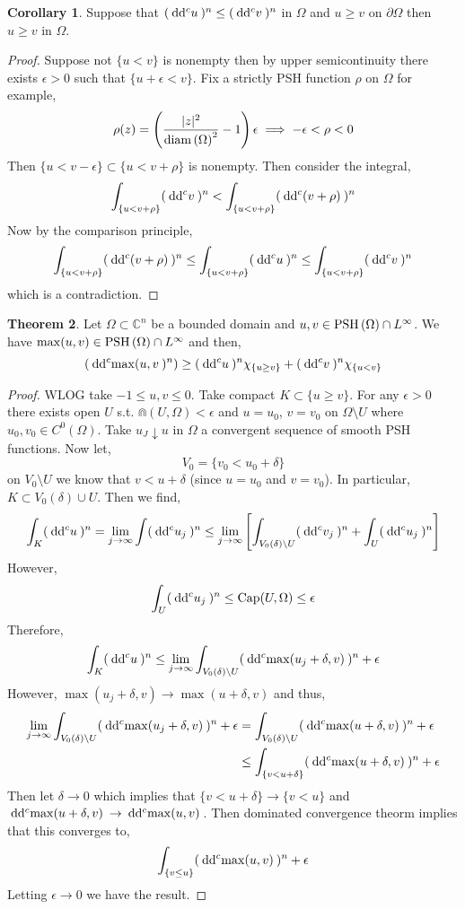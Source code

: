 \documentclass[12pt]{extarticle}
\newcommand{\C}{\mathbb{C}}
\theoremstyle{definition}
\newtheorem{theorem}{Theorem}[section]
\newtheorem{corollary}[theorem]{Corollary}
\begin{document}
\begin{corollary}
Suppose that $(\: \mathrm{d}\mathrm{d}^c{u} \:)^n \le (\: \mathrm{d}\mathrm{d}^c{v} \:)^n$ in $\Omega$ and $u \ge v$ on $\partial \Omega$ then $u \ge v$ in $\Omega$.
\end{corollary}

\begin{proof}
Suppose not $\{ u < v \}$ is nonempty then by upper semicontinuity there exists $\epsilon > 0$ such that $\{ u + \epsilon < v \}$. Fix a strictly PSH function $\rho$ on $\Omega$ for example,
\[ \rho(z) = \left( \frac{|z|^2}{\mathrm{diam}\left(\Omega\right)^2} - 1 \right) \epsilon \implies - \epsilon < \rho < 0 \]
Then $\{ u < v - \epsilon \} \subset \{ u < v + \rho \}$ is nonempty. Then consider the integral,
\[ \int_{\{u < v + \rho \}} (\: \mathrm{d}\mathrm{d}^c{v} \:)^n < \int_{\{u < v + \rho \}} (\: \mathrm{d}\mathrm{d}^c{(v + \rho)} \:)^n \] 
Now by the comparison principle, 
\[ \int_{\{u < v + \rho \}} (\: \mathrm{d}\mathrm{d}^c{(v + \rho)} \:)^n \le \int_{\{u < v + \rho\}} (\: \mathrm{d}\mathrm{d}^c{u} \:)^n \le \int_{\{u < v + \rho \}} (\: \mathrm{d}\mathrm{d}^c{v} \:)^n \] 
which is a contradiction. 
\end{proof}

\begin{theorem}
Let $\Omega \subset \C^n$ be a bounded domain and $u,v \in \mathrm{PSH}\left( \Omega \right) \cap L^\infty$. We have $\max(u,v) \in \mathrm{PSH}\left( \Omega \right) \cap L^\infty$ and then,
\[ (\: \mathrm{d}\mathrm{d}^c{\max(u,v} \:)^n) \ge (\: \mathrm{d}\mathrm{d}^c{u} \:)^n \chi_{\{ u \ge v\}} + (\: \mathrm{d}\mathrm{d}^c{v} \:)^n \chi_{\{u < v \}} \]
\end{theorem}

\begin{proof}
WLOG take $-1 \le u,v \le 0$. Take compact $K \subset \{ u \ge v \}$. For any $\epsilon > 0$ there exists open $U$ s.t. $\Cap(U, \Omega) < \epsilon$ and $u = u_0$, $v = v_0$ on $\Omega \setminus U$ where $u_0, v_0 \in C^0(\Omega)$. Take $u_J \downarrow u$ in $\Omega$ a convergent sequence of smooth PSH functions. Now let,
\[ V_0 = \{ v_0 < u_0 + \delta \} \] 
on $V_0 \setminus U$ we know that $v < u + \delta$ (since $u = u_0$ and $v = v_0$). In particular, $K \subset V_0(\delta) \cup U$. Then we find,
\[ \int_K (\: \mathrm{d}\mathrm{d}^c{u} \:)^n = \lim_{j \to \infty} \int (\: \mathrm{d}\mathrm{d}^c{u_j} \:)^n \le \lim_{j \to \infty} \left[ \int_{V_0(\delta) \setminus U} (\: \mathrm{d}\mathrm{d}^c{v_j} \:)^n + \int_U (\: \mathrm{d}\mathrm{d}^c{u_j} \:)^n \right]  \] 
However, 
\[ \int_U (\: \mathrm{d}\mathrm{d}^c{u_j} \:)^n \le \mathrm{Cap}(U, \Omega) \le \epsilon \]
Therefore, 
\[ \int_K (\: \mathrm{d}\mathrm{d}^c{u} \:)^n \le \lim_{j \to \infty} \int_{V_0(\delta) \setminus U} (\: \mathrm{d}\mathrm{d}^c{\max(u_j + \delta, v)} \:)^n + \epsilon \]
However, $\max(u_j + \delta, v) \to \max(u + \delta, v)$ and thus,
\begin{align*}
\lim_{j \to \infty} \int_{V_0(\delta) \setminus U} (\: \mathrm{d}\mathrm{d}^c{\max(u_j + \delta, v)} \:)^n + \epsilon & = \int_{V_0(\delta) \setminus U} (\: \mathrm{d}\mathrm{d}^c{\max(u + \delta, v)} \:)^n + \epsilon 
\\
& \le \int_{\{v < u + \delta\}} (\: \mathrm{d}\mathrm{d}^c{\max(u + \delta, v)} \:)^n + \epsilon
\end{align*}
Then let $\delta \to 0$ which implies that $\{ v < u + \delta \} \to \{ v < u \}$ and $\: \mathrm{d}\mathrm{d}^c{\max(u + \delta, v)} \: \to \: \mathrm{d}\mathrm{d}^c{\max(u , v)} \:$. Then dominated convergence theorm implies that this converges to,
\[ \int_{\{ v \le u \}} (\: \mathrm{d}\mathrm{d}^c{\max(u,v)} \:)^n + \epsilon \]
Letting $\epsilon \to 0$ we have the result. 
\end{proof}
\end{document}
